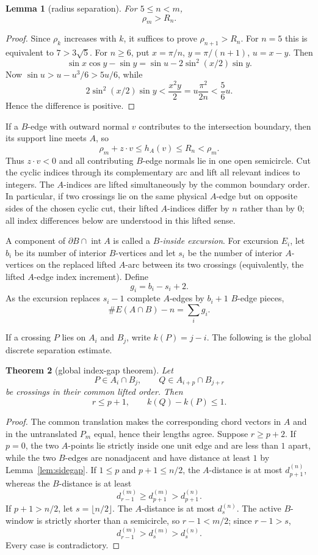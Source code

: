 \documentclass[11pt]{article}
\newtheorem{theorem}{Theorem}[section]
\newtheorem{lemma}[theorem]{Lemma}
\theoremstyle{remark}
\begin{document}
\begin{lemma}[radius separation]\label{lem:radiussep}
For $5\le n<m$,
\[
\rho_m>R_n.
\]
\end{lemma}

\begin{proof}
Since $\rho_k$ increases with $k$, it suffices to prove $\rho_{n+1}>R_n$. For $n=5$ this is equivalent to $7>3\sqrt5$. For $n\ge6$, put $x=\pi/n$, $y=\pi/(n+1)$, $u=x-y$. Then
\[
\sin x\cos y-\sin y=\sin u-2\sin^2(x/2)\sin y.
\]
Now $\sin u>u-u^3/6>5u/6$, while
\[
2\sin^2(x/2)\sin y<\frac{x^2y}{2}=u\frac{\pi^2}{2n}<\frac56u.
\]
Hence the difference is positive.
\end{proof}

If a $B$-edge with outward normal $v$ contributes to the intersection boundary, then its support line meets $A$, so
\[
\rho_m+z\cdot v\le h_A(v)\le R_n<\rho_m.
\]
Thus $z\cdot v<0$ and all contributing $B$-edge normals lie in one open semicircle. Cut the cyclic indices through its complementary arc and lift all relevant indices to integers. The $A$-indices are lifted simultaneously by the common boundary order. In particular, if two crossings lie on the same physical $A$-edge but on opposite sides of the chosen cyclic cut, their lifted $A$-indices differ by $n$ rather than by $0$; all index differences below are understood in this lifted sense.

A component of $\partial B\cap\operatorname{int}A$ is called a \emph{$B$-inside excursion}. For excursion $E_i$, let $b_i$ be its number of interior $B$-vertices and let $s_i$ be the number of interior $A$-vertices on the replaced lifted $A$-arc between its two crossings (equivalently, the lifted $A$-edge index increment). Define
\[
g_i=b_i-s_i+2.
\tag{4.1}
\]
As the excursion replaces $s_i-1$ complete $A$-edges by $b_i+1$ $B$-edge pieces,
\[
\#E(A\cap B)-n=\sum_i g_i.
\tag{4.2}
\]

If a crossing $P$ lies on $A_i$ and $B_j$, write $k(P)=j-i$. The following is the global discrete separation estimate.

\begin{theorem}[global index-gap theorem]\label{thm:indexgap}
Let
\[
P\in A_i\cap B_j,\qquad Q\in A_{i+p}\cap B_{j+r}
\]
be crossings in their common lifted order. Then
\[
r\le p+1,
\qquad k(Q)-k(P)\le1.
\tag{4.3}
\]
\end{theorem}

\begin{proof}
The common translation makes the corresponding chord vectors in $A$ and in the untranslated $P_m$ equal, hence their lengths agree. Suppose $r\ge p+2$. If $p=0$, the two $A$-points lie strictly inside one unit edge and are less than $1$ apart, while the two $B$-edges are nonadjacent and have distance at least $1$ by Lemma~\ref{lem:sidegap}. If $1\le p$ and $p+1\le n/2$, the $A$-distance is at most $d_{p+1}^{(n)}$, whereas the $B$-distance is at least
\[
d_{r-1}^{(m)}\ge d_{p+1}^{(m)}>d_{p+1}^{(n)}.
\]
If $p+1>n/2$, let $s=\lfloor n/2\rfloor$. The $A$-distance is at most $d_s^{(n)}$. The active $B$-window is strictly shorter than a semicircle, so $r-1<m/2$; since $r-1>s$,
\[
d_{r-1}^{(m)}>d_s^{(m)}>d_s^{(n)}.
\]
Every case is contradictory.
\end{proof}
\end{document}
